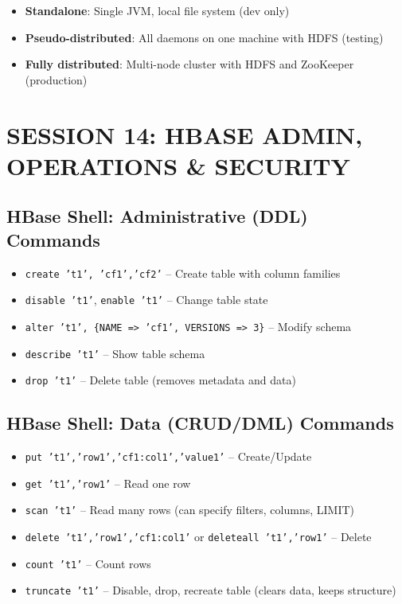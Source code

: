\documentclass[11pt, onecolumn, a4paper]{article}
\begin{document}
\begin{itemize}
  \item \textbf{Standalone}: Single JVM, local file system (dev only)
  \item \textbf{Pseudo-distributed}: All daemons on one machine with HDFS (testing)
  \item \textbf{Fully distributed}: Multi-node cluster with HDFS and ZooKeeper (production)
\end{itemize}

\newpage
\section{SESSION 14: HBASE ADMIN, OPERATIONS \& SECURITY}

\subsection{HBase Shell: Administrative (DDL) Commands}

\begin{itemize}
  \item \texttt{create 't1', 'cf1','cf2'} -- Create table with column families
  \item \texttt{disable 't1'}, \texttt{enable 't1'} -- Change table state
  \item \texttt{alter 't1', \{NAME => 'cf1', VERSIONS => 3\}} -- Modify schema
  \item \texttt{describe 't1'} -- Show table schema
  \item \texttt{drop 't1'} -- Delete table (removes metadata and data)
\end{itemize}

\subsection{HBase Shell: Data (CRUD/DML) Commands}

\begin{itemize}
  \item \texttt{put 't1','row1','cf1:col1','value1'} -- Create/Update
  \item \texttt{get 't1','row1'} -- Read one row
  \item \texttt{scan 't1'} -- Read many rows (can specify filters, columns, LIMIT)
  \item \texttt{delete 't1','row1','cf1:col1'} or \texttt{deleteall 't1','row1'} -- Delete
  \item \texttt{count 't1'} -- Count rows
  \item \texttt{truncate 't1'} -- Disable, drop, recreate table (clears data, keeps structure)
\end{itemize}
\end{document}
